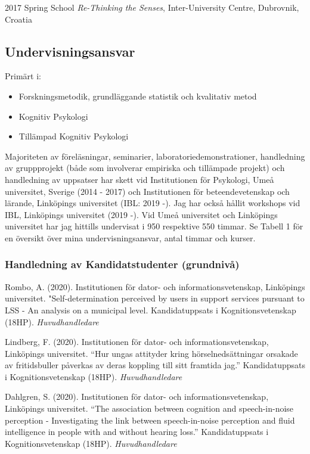 \documentclass[]{article}
\providecommand{\tightlist}{%
  \setlength{\itemsep}{0pt}\setlength{\parskip}{0pt}}
\begin{document}
2017 Spring School \emph{Re-Thinking the Senses}, Inter-University
Centre, Dubrovnik, Croatia

\hypertarget{undervisningsansvar}{%
\subsection{Undervisningsansvar}\label{undervisningsansvar}}

Primärt i:

\begin{itemize}
\tightlist
\item
  Forskningsmetodik, grundläggande statistik och kvalitativ metod
\item
  Kognitiv Psykologi
\item
  Tillämpad Kognitiv Psykologi
\end{itemize}

Majoriteten av föreläsningar, seminarier, laboratoriedemonstrationer,
handledning av gruppprojekt (både som involverar empiriska och
tillämpade projekt) och handledning av uppsatser har skett vid
Institutionen för Psykologi, Umeå universitet, Sverige (2014 - 2017) och
Institutionen för beteendevetenskap och lärande, Linköpings universitet
(IBL: 2019 -). Jag har också hållit workshops vid IBL, Linköpings
universitet (2019 -). Vid Umeå universitet och Linköpings universitet
har jag hittills undervisat i 950 respektive 550 timmar. Se Tabell 1 för
en översikt över mina undervisningsansvar, antal timmar och kurser.

\hypertarget{handledning-av-kandidatstudenter-grundnivuxe5}{%
\subsubsection{Handledning av Kandidatstudenter
(grundnivå)}\label{handledning-av-kandidatstudenter-grundnivuxe5}}

Rombo, A. (2020). Institutionen för dator- och informationsvetenskap,
Linköpings universitet. "Self-determination perceived by users in
support services pursuant to LSS - An analysis on a municipal level.
Kandidatuppsats i Kognitionsvetenskap (18HP). \emph{Huvudhandledare}

Lindberg, F. (2020). Institutionen för dator- och informationsvetenskap,
Linköpings universitet. ``Hur ungas attityder kring hörselnedsättningar
orsakade av fritidsbuller påverkas av deras koppling till sitt framtida
jag.'' Kandidatuppsats i Kognitionsvetenskap (18HP).
\emph{Huvudhandledare}

Dahlgren, S. (2020). Institutionen för dator- och informationsvetenskap,
Linköpings universitet. ``The association between cognition and
speech-in-noise perception - Investigating the link between
speech-in-noise perception and fluid intelligence in people with and
without hearing loss.'' Kandidatuppsats i Kognitionsvetenskap (18HP).
\emph{Huvudhandledare}
\end{document}
